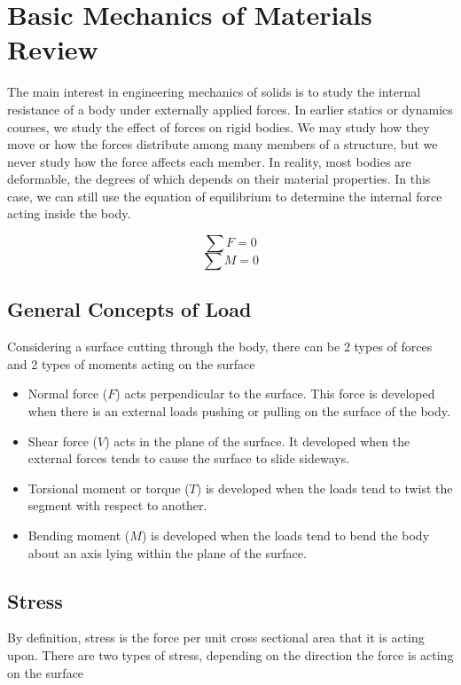 \documentclass[
10pt,
a4paper,
openany,
svgnames,
]{book} %
\begin{document}
\chapter{Basic Mechanics of Materials Review}

The main interest in engineering mechanics of solids is to study the internal resistance of a body under externally applied forces. In earlier statics or dynamics courses, we study the effect of forces on rigid bodies. We may study how they move or how the forces distribute among many members of a structure, but we never study how the force affects each member. In reality, most bodies are deformable, the degrees of which depends on their material properties. In this case, we can still use the equation of equilibrium to determine the internal force acting inside the body.

$$ \sum F = 0 $$
$$ \sum M = 0 $$

\section{General Concepts of Load}

Considering a surface cutting through the body, there can be 2 types of forces and 2 types of moments acting on the surface

\begin{itemize}
\item Normal force ($F$) acts perpendicular to the surface. This force is developed when there is an external loads pushing or pulling on the surface of the body.
\item Shear force ($V$) acts in the plane of the surface. It developed when the external forces tends to cause the surface to slide sideways.
\item Torsional moment or torque ($T$) is developed when the loads tend to twist the segment with respect to another.
\item Bending moment ($M$) is developed when the loads tend to bend the body about an axis lying within the plane of the surface.
\end{itemize}

\section{Stress}

By definition, stress is the force per unit cross sectional area that it is acting upon. There are two types of stress, depending on the direction the force is acting on the surface
\end{document}
